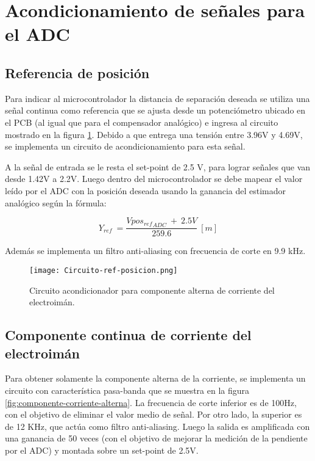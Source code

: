\section{Acondicionamiento de señales para el ADC}

\subsection{Referencia de posición}

\noindent Para indicar al microcontrolador la distancia de separación deseada se utiliza una señal continua como referencia que se ajusta desde un potenciómetro ubicado en el PCB (al igual que para el compensador analógico) e ingresa al circuito mostrado en la figura \ref{fig:circuito-ref-posicion}. Debido a que entrega una tensión entre 3.96V y 4.69V, se implementa un circuito de acondicionamiento para esta señal.

\noindent A la señal de entrada se le resta el set-point de 2.5 V, para lograr señales que van desde 1.42V a 2.2V. Luego dentro del microcontrolador se debe mapear el valor leído por el ADC con la posición deseada usando la ganancia del estimador analógico según la fórmula:

\begin{equation} 
	Y_{ref}\ =\frac{Vpo{s_{ref}}_{ADC}\ +\ 2.5V}{259.6}\ [m]
\end{equation}

\noindent Además se implementa un filtro anti-aliasing con frecuencia de corte en 9.9 kHz.

\begin{figure}[H]
	\centering
	\texttt{[image: Circuito-ref-posicion.png]}
	\caption{Circuito acondicionador para componente alterna de corriente del electroimán.}
	\label{fig:circuito-ref-posicion}
\end{figure}

\subsection{Componente  continua de corriente del electroimán}

\noindent Para obtener solamente la componente alterna de la corriente, se implementa un circuito con característica pasa-banda que se muestra en la figura \ref{fig:componente-corriente-alterna}. La frecuencia de corte inferior  es de 100Hz, con el objetivo de eliminar el valor medio de señal. Por otro lado, la superior es de 12 KHz, que actúa como filtro anti-aliasing. Luego la salida es amplificada con una ganancia de 50 veces (con el objetivo de mejorar la medición de la pendiente por el ADC) y montada sobre un set-point de 2.5V.

